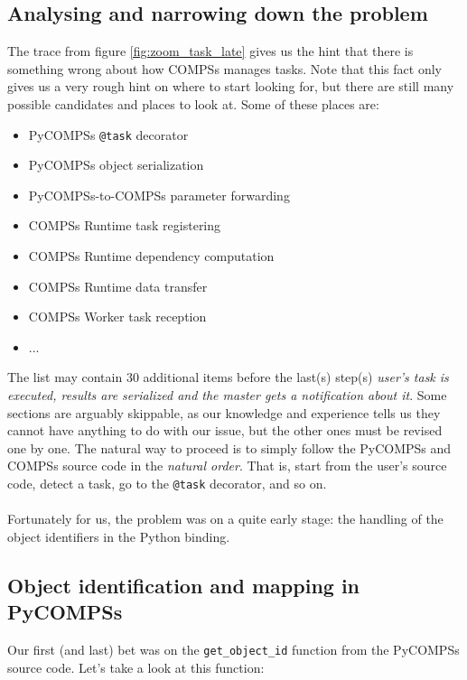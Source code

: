 \subsection{Analysing and narrowing down the problem}
The trace from figure \ref{fig:zoom_task_late} gives us the hint that there is something wrong about how COMPSs manages tasks. Note that this fact only gives us a very rough hint on where to start looking for, but there are still many possible candidates and places to look at. Some of these places are:
\begin{itemize}
\item PyCOMPSs \verb|@task| decorator
\item PyCOMPSs object serialization
\item PyCOMPSs-to-COMPSs parameter forwarding
\item COMPSs Runtime task registering
\item COMPSs Runtime dependency computation
\item COMPSs Runtime data transfer
\item COMPSs Worker task reception
\item ...
\end{itemize}
The list may contain 30 additional items before the last(s) step(s) \textit{user's task is executed, results are serialized and the master gets a notification about it}. Some sections are arguably skippable, as our knowledge and experience tells us they cannot have anything to do with our issue, but the other ones must be revised one by one. The natural way to proceed is to simply follow the PyCOMPSs and COMPSs source code in the \textit{natural order}. That is, start from the user's source code, detect a task, go to the \verb|@task| decorator, and so on.\\
\\
Fortunately for us, the problem was on a quite early stage: the handling of the object identifiers in the Python binding.

\subsection{Object identification and mapping in PyCOMPSs}
Our first (and last) bet was on the \verb|get_object_id| function from the PyCOMPSs source code. Let's take a look at this function:

\inputminted{python}{snippets/get_object_id_old.py}

